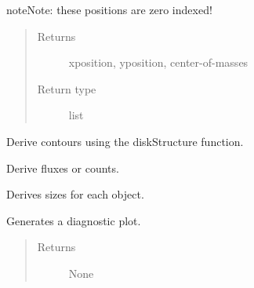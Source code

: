 \documentclass[a4paper,12pt,english]{sphinxmanual}
\begin{document}
\begin{fulllineitems}
\begin{fulllineitems}
\begin{notice}{note}{Note:}
these positions are zero indexed!
\end{notice}
\begin{quote}\begin{description}
\item[{Returns}] \leavevmode
xposition, yposition, center-of-masses

\item[{Return type}] \leavevmode
list

\end{description}\end{quote}

\end{fulllineitems}


\begin{fulllineitems}
Derive contours using the diskStructure function.

\end{fulllineitems}


\begin{fulllineitems}
Derive fluxes or counts.

\end{fulllineitems}


\begin{fulllineitems}
Derives sizes for each object.

\end{fulllineitems}


\begin{fulllineitems}
Generates a diagnostic plot.
\begin{quote}\begin{description}
\item[{Returns}] \leavevmode
None

\end{description}\end{quote}

\end{fulllineitems}


\end{fulllineitems}
\end{document}
